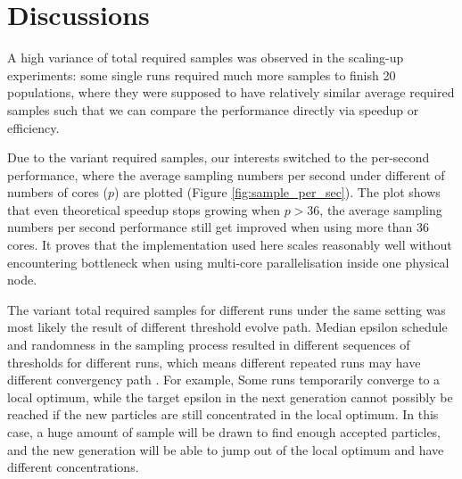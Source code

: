 \section{Discussions}

A high variance of total required samples was observed in the scaling-up experiments: some single runs required much more samples to finish 20 populations, where they were supposed to have relatively similar average required samples such that we can compare the performance directly via speedup or efficiency.

Due to the variant required samples, our interests switched to the per-second performance, where the average sampling numbers per second under different of numbers of cores ($p$) are plotted (Figure \ref{fig:sample_per_sec}). The plot shows that even theoretical speedup stops growing when $p>36$, the average sampling numbers per second performance still get improved when using more than 36 cores. It proves that the implementation used here scales reasonably well without encountering bottleneck when using multi-core parallelisation inside one physical node.

The variant total required samples for different runs under the same setting was most likely the result of different threshold evolve path. Median epsilon schedule and randomness in the sampling process resulted in different sequences of thresholds for different runs, which means different repeated runs may have different convergency path \cite{threshold}. For example, Some runs temporarily converge to a local optimum, while the target epsilon in the next generation cannot possibly be reached if the new particles are still concentrated in the local optimum. In this case, a huge amount of sample will be drawn to find enough accepted particles, and the new generation will be able to jump out of the local optimum and have different concentrations. 

